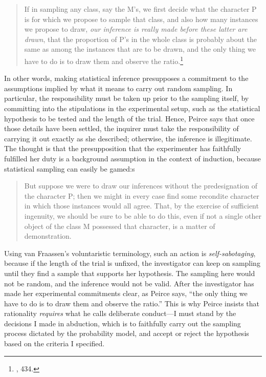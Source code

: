 \begin{quote}
If in sampling any class, say the M's, we first decide what the
character P is for which we propose to sample that class, and also how
many instances we propose to draw, \emph{our inference is really made
before these latter are drawn}, that the proportion of P's in the whole
class is probably about the same as among the instances that are to be
drawn, and the only thing we have to do is to draw them and observe the
ratio.\footnote{\cite{probableinference}, 434.}
\end{quote}

In other words, making statistical inference presupposes a commitment to
the assumptions implied by what it means to carry out random sampling.
In particular, the responsibility must be taken up prior to the sampling
itself, by committing into the stipulations in the experimental setup,
such as the statistical hypothesis to be tested and the length of the
trial. Hence, Peirce says that once those details have been settled, the
inquirer must take the responsibility of carrying it out exactly as she
described; otherwise, the inference is illegitimate. The thought is that the presupposition that the experimenter has faithfully fulfilled her duty is a background assumption in the context of induction, because statistical sampling can easily be gamed:s

\begin{quote}
But suppose we were to draw our inferences without the predesignation of
the character P; then we might in every case find some recondite
character in which those instances would all agree. That, by the
exercise of sufficient ingenuity, we should be sure to be able to do
this, even if not a single other object of the class M possessed that
character, is a matter of demonstration.
\end{quote}

Using van Fraassen's voluntaristic terminology, such an action is
\emph{self-sabotaging}, because if the length of the trial is unfixed,
the investigator can keep on sampling until they find a sample that
supports her hypothesis. The sampling here would not be random, and the
inference would not be valid. After the investigator has made her
experimental commitments clear, as Peirce says, ``the only thing we have
to do is to draw them and observe the ratio.'' This is why Peirce
insists that rationality \emph{requires} what he calls deliberate
conduct---I must stand by the decisions I made in abduction, which is to
faithfully carry out the sampling process dictated by the probability
model, and accept or reject the hypothesis based on the criteria I
specified. 


